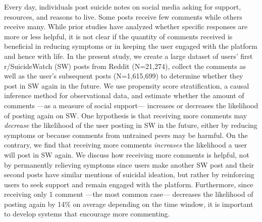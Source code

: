 Every day, individuals post suicide notes on social media asking for support, resources, and reasons to live. Some posts receive few comments while others receive many. While prior studies have analyzed whether specific responses are more or less helpful, it is not clear if the quantity of comments received is beneficial in reducing symptoms or in keeping the user engaged with the platform and hence with life. In the present study, we create a large dataset of users' first r/SuicideWatch (SW) posts from Reddit (N=21,274), collect the comments as well as the user's subsequent posts (N=1,615,699) to determine whether they post in SW again in the future. We use propensity score stratification, a causal inference method for observational data, and estimate whether the amount of comments —as a measure of social support— increases or decreases the likelihood of posting again on SW. One hypothesis is that receiving more comments may \textit{decrease} the likelihood of the user posting in SW in the future, either by reducing symptoms or because comments from untrained peers may be harmful. On the contrary, we find that receiving more comments \textit{increases} the likelihood a user will post in SW again. We discuss how receiving more comments is helpful, not by permanently relieving symptoms since users make another SW post and their second posts have similar mentions of suicidal ideation, but rather by reinforcing users to seek support and remain engaged with the platform. Furthermore, since receiving only 1 comment —the most common case— decreases the likelihood of posting again by 14\% on average depending on the time window, it is important to develop systems that encourage more commenting.
